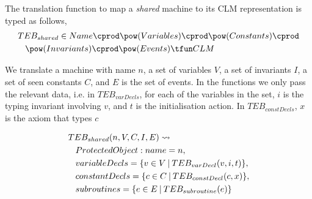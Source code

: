 The translation function to map a \emph{shared} machine to its CLM representation is typed as follows,
\begin{equation}
\begin{split}
&TEB_{shared} \in Name \cprod \pow(Variables) \cprod \pow(Constants) \cprod\\
& \hspace*{0.3cm}\pow(Invariants) \cprod \pow(Events) \tfun CLM
\end{split}
\notag
\end{equation}

We translate a machine with name $n$, a set of variables $V$, a set of invariants $I$, a set of seen constants $C$, and $E$ is the set of events. In the functions we only pass the relevant data, i.e. in $TEB_{varDecls}$, for each of the variables in the set,  $i$ is the typing invariant involving $v$, and $t$ is the initialisation action. In $TEB_{constDecls}$, $x$ is the axiom that types $c$ 


\begin{equation}
\begin{split}
&TEB_{shared}(n, V, C, I, E) \leadsto\\
& \hspace*{0.3cm}ProtectedObject: name = n, \\
& \hspace*{0.3cm}variableDecls = \{ v\in V~ \vline~  TEB_{varDecl}(v, i, t) \},\\
& \hspace*{0.3cm}constantDecls = \{ c\in C~ \vline~ TEB_{constDecl}(c, x)\},\\
& \hspace*{0.3cm}subroutines = \{e\in E ~\vline~ TEB_{subroutine}(e)\} 
\end{split}
\notag
\end{equation}

